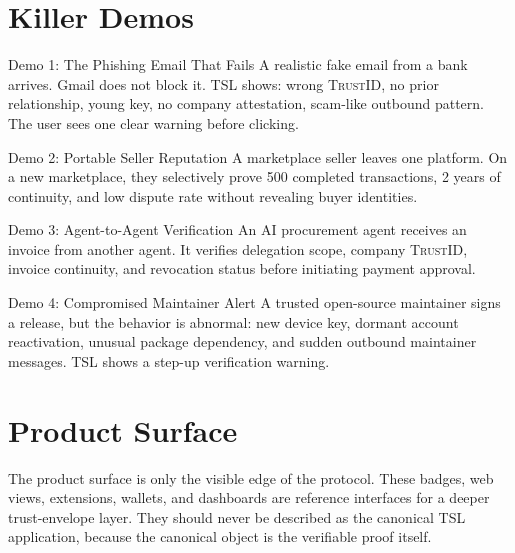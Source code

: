 \documentclass[11pt]{article}
\newcommand{\TSL}{\textsc{TSL}}
\newcommand{\TrustID}{\textsc{TrustID}}
\begin{document}
\section{Killer Demos}

\begin{marketbox}{Demo 1: The Phishing Email That Fails}
A realistic fake email from a bank arrives. Gmail does not block it. \TSL{} shows: wrong \TrustID{}, no prior relationship, young key, no company attestation, scam-like outbound pattern. The user sees one clear warning before clicking.
\end{marketbox}

\begin{marketbox}{Demo 2: Portable Seller Reputation}
A marketplace seller leaves one platform. On a new marketplace, they selectively prove 500 completed transactions, 2 years of continuity, and low dispute rate without revealing buyer identities.
\end{marketbox}

\begin{marketbox}{Demo 3: Agent-to-Agent Verification}
An AI procurement agent receives an invoice from another agent. It verifies delegation scope, company \TrustID{}, invoice continuity, and revocation status before initiating payment approval.
\end{marketbox}

\begin{marketbox}{Demo 4: Compromised Maintainer Alert}
A trusted open-source maintainer signs a release, but the behavior is abnormal: new device key, dormant account reactivation, unusual package dependency, and sudden outbound maintainer messages. \TSL{} shows a step-up verification warning.
\end{marketbox}

\section{Product Surface}

The product surface is only the visible edge of the protocol. These badges, web views, extensions, wallets, and dashboards are reference interfaces for a deeper trust-envelope layer. They should never be described as the canonical \TSL{} application, because the canonical object is the verifiable proof itself.
\end{document}
